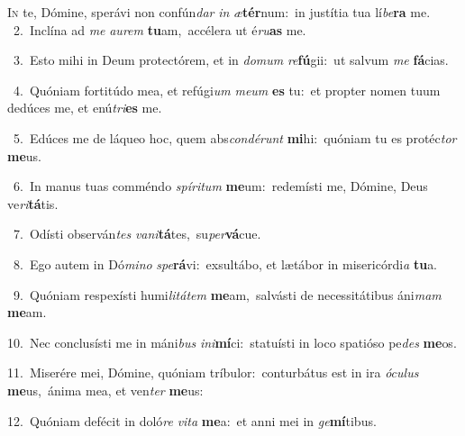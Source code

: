 \lettrine{\initial\textcolor{\initialcolor}{I}}{n} te, Dómine, sperávi non confún\textit{dar} \textit{in} \textit{æ}\-\textbf{tér}num:~\star in justítia tua lí\-\textit{be}\-\textbf{ra} me.\\
{\numbfont\textcolor{\numbcolor}{~2.}}~Inclína ad \textit{me} \textit{au}\-\textit{rem} \textbf{tu}\-am,~\star accélera ut é\-\textit{ru}\-\textbf{as} me.\par
{\numbfont\textcolor{\numbcolor}{~3.}}~Esto mihi in Deum protectórem, et in \textit{do}\-\textit{mum} \textit{re}\-\textbf{fú}gii:~\star ut salvum \textit{me} \textbf{fá}\-cias.\par
{\numbfont\textcolor{\numbcolor}{~4.}}~Quóniam fortitúdo mea, et refúgi\textit{um} \textit{me}\-\textit{um} \textbf{es} tu:~\star et propter nomen tuum dedúces me, et enú\-\textit{tri}\-\textbf{es} me.\par
{\numbfont\textcolor{\numbcolor}{~5.}}~Edúces me de láqueo hoc, quem abs\-\textit{con}\-\textit{dé}\textit{runt} \textbf{mi}\-hi:~\star quóniam tu es protéc\textit{tor} \textbf{me}\-us.\par
{\numbfont\textcolor{\numbcolor}{~6.}}~In manus tuas comméndo \textit{spí}\-\textit{ri}\textit{tum} \textbf{me}\-um:~\star redemísti me, Dómine, Deus ve\-\textit{ri}\-\textbf{tá}tis.\par
{\numbfont\textcolor{\numbcolor}{~7.}}~Odísti observán\textit{tes} \textit{va}\-\textit{ni}\textbf{tá}tes,~\star su\-\textit{per}\-\textbf{vá}cue.\par
{\numbfont\textcolor{\numbcolor}{~8.}}~Ego autem in Dó\-\textit{mi}\-\textit{no} \textit{spe}\-\textbf{rá}vi:~\star exsultábo, et lætábor in misericórdi\textit{a} \textbf{tu}\-a.\par
{\numbfont\textcolor{\numbcolor}{~9.}}~Quóniam respexísti humi\-\textit{li}\-\textit{tá}\textit{tem} \textbf{me}\-am,~\star salvásti de necessitátibus áni\textit{mam} \textbf{me}\-am.\par
{\numbfont\textcolor{\numbcolor}{10.}}~Nec conclusísti me in máni\textit{bus} \textit{in}\-\textit{i}\textbf{mí}ci:~\star statuísti in loco spatióso pe\textit{des} \textbf{me}\-os.\par
{\numbfont\textcolor{\numbcolor}{11.}}~Miserére mei, Dómine, quóniam tríbulor:~\dagger conturbátus est in ira \textit{ó}\-\textit{cu}\textit{lus} \textbf{me}\-us,~\star ánima mea, et ven\textit{ter} \textbf{me}\-us:\par
{\numbfont\textcolor{\numbcolor}{12.}}~Quóniam defécit in doló\textit{re} \textit{vi}\-\textit{ta} \textbf{me}\-a:~\star et anni mei in \textit{ge}\-\textbf{mí}tibus.\par
